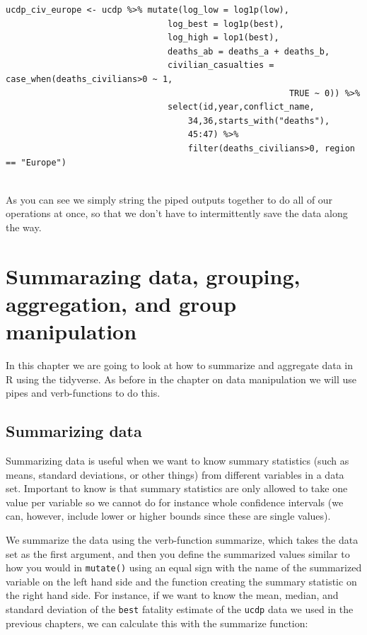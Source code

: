\documentclass[
]{book}
\begin{document}
\begin{verbatim}
ucdp_civ_europe <- ucdp %>% mutate(log_low = log1p(low),
                                log_best = log1p(best),
                                log_high = lop1(best),
                                deaths_ab = deaths_a + deaths_b,
                                civilian_casualties = case_when(deaths_civilians>0 ~ 1,
                                                        TRUE ~ 0)) %>%                 
                                select(id,year,conflict_name,
                                    34,36,starts_with("deaths"),
                                    45:47) %>% 
                                    filter(deaths_civilians>0, region == "Europe")
                                    
\end{verbatim}

As you can see we simply string the piped outputs together to do all of our operations at once, so that we don't have to intermittently save the data along the way.

\hypertarget{summarazing-data-grouping-aggregation-and-group-manipulation}{%
\chapter{Summarazing data, grouping, aggregation, and group manipulation}\label{summarazing-data-grouping-aggregation-and-group-manipulation}}

In this chapter we are going to look at how to summarize and aggregate data in R using the tidyverse. As before in the chapter on data manipulation we will use pipes and verb-functions to do this.

\hypertarget{summarizing-data}{%
\section{Summarizing data}\label{summarizing-data}}

Summarizing data is useful when we want to know summary statistics (such as means, standard deviations, or other things) from different variables in a data set. Important to know is that summary statistics are only allowed to take one value per variable so we cannot do for instance whole confidence intervals (we can, however, include lower or higher bounds since these are single values).

We summarize the data using the verb-function summarize, which takes the data set as the first argument, and then you define the summarized values similar to how you would in \texttt{mutate()} using an equal sign with the name of the summarized variable on the left hand side and the function creating the summary statistic on the right hand side. For instance, if we want to know the mean, median, and standard deviation of the \texttt{best} fatality estimate of the \texttt{ucdp} data we used in the previous chapters, we can calculate this with the summarize function:
\end{document}
